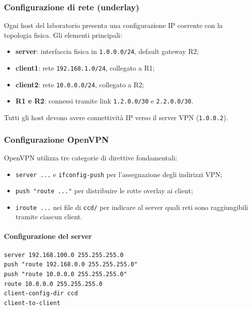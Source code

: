 \subsubsection{Configurazione di rete (underlay)}

Ogni host del laboratorio presenta una configurazione IP coerente con la topologia fisica.
Gli elementi principali:

\begin{itemize}
    \item \textbf{server}: interfaccia fisica in \texttt{1.0.0.0/24}, default gateway R2;
    \item \textbf{client1}: rete \texttt{192.168.1.0/24}, collegato a R1;
    \item \textbf{client2}: rete \texttt{10.0.0.0/24}, collegato a R2;
    \item \textbf{R1 e R2}: connessi tramite link \texttt{1.2.0.0/30} e \texttt{2.2.0.0/30}.
\end{itemize}

Tutti gli host devono avere connettività IP verso il server VPN (\texttt{1.0.0.2}).

\subsubsection{Configurazione OpenVPN}

OpenVPN utilizza tre categorie di direttive fondamentali:

\begin{itemize}
    \item \verb|server ...| e \verb|ifconfig-push| per l’assegnazione degli indirizzi VPN;
    \item \verb|push "route ..."| per distribuire le rotte overlay ai client;
    \item \verb|iroute ...| nei file di \texttt{ccd/} per indicare al server quali reti
          sono raggiungibili tramite ciascun client.
\end{itemize}

\paragraph{Configurazione del server}

\begin{verbatim}
server 192.168.100.0 255.255.255.0
push "route 192.168.0.0 255.255.255.0"
push "route 10.0.0.0 255.255.255.0"
route 10.0.0.0 255.255.255.0
client-config-dir ccd
client-to-client
\end{verbatim}


